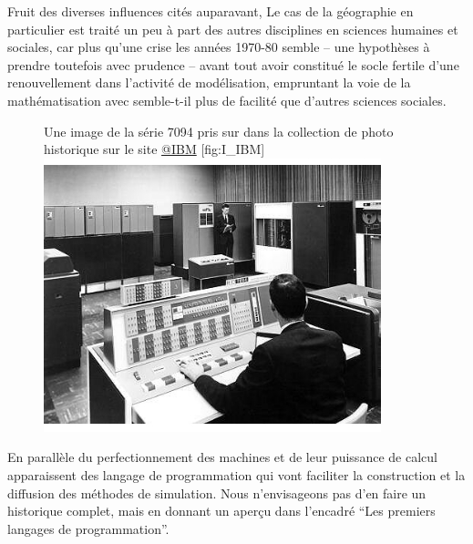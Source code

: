 Fruit des diverses influences cités auparavant, Le cas de la géographie en particulier est traité un peu à part des autres disciplines en sciences humaines et sociales, car plus qu'une crise les années 1970-80 semble -- une hypothèses à prendre toutefois avec prudence -- avant tout avoir constitué le socle fertile d'une renouvellement dans l'activité de modélisation, empruntant la voie de la mathématisation avec semble-t-il plus de facilité que d'autres sciences sociales.

\begin{figure}[h]
\begin{sidecaption}[fortoc]{Une image de la série 7094 pris sur dans la collection de photo historique sur le site \href{http://www-03.ibm.com/ibm/history/exhibits/mainframe/mainframe_album.html}{@IBM} }[fig:I_IBM]
  \centering
 \includegraphics[width=.8\linewidth]{IBM7094.jpg}
  \end{sidecaption}
\end{figure}

En parallèle du perfectionnement des machines et de leur puissance de calcul apparaissent des langage de programmation qui vont faciliter la construction et la diffusion des méthodes de simulation. Nous n'envisageons pas d'en faire un historique complet, mais en donnant un aperçu dans l'encadré \enquote{Les premiers langages de programmation}.

